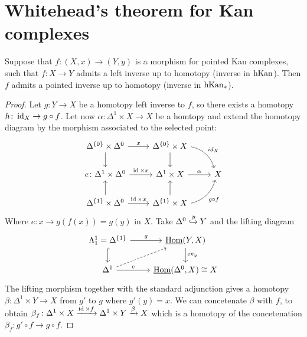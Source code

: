 \section{Whitehead's theorem for Kan complexes}

\begin{lem}
\label{homotopy inverses are pointed homotopy inverses}
    Suppose that $f\colon (X,x) \to (Y,y)$ is a morphism for pointed Kan complexes, such that $f\colon X \to Y$ admits a left inverse up to homotopy (inverse in $\operatorname{hKan}$).
    Then $f$ admits a pointed inverse up to homotopy (inverse in $\operatorname{hKan}_*$).
\end{lem}

\begin{proof}
    Let $g\colon Y \to X$ be a homotopy left inverse to $f$, so there exists a homotopy $h\colon \operatorname{id}_X \to g\circ f$.
    Let now $\alpha \colon \Delta^1 \times X \to X$ be a homtopy and extend the homotopy diagram by the morphism associated to the selected point:
    \[
    \begin{tikzcd}
        \Delta^{\{0\}} \times \Delta^0
        \ar[r, "x"]
        \ar[d]
        &
        \Delta^{\{0\}} \times X
        \ar[d]
        \ar[rd, bend left, "id_X"]
        \\
        e\colon\Delta^1 \times \Delta^0
        \ar[r, "\id \times x"]
        &
        \Delta^1 \times X
        \ar[r, "\alpha"]
        &
        X
        \\
        \Delta^{\{1\}} \times \Delta^0
        \ar[u]
        \ar[r, "\id \times x"]
        &
        \Delta^{\{1\}} \times X
        \ar[u]
        \ar[ru, bend right, "g \circ f"']
    \end{tikzcd}
    \]
    Where $e\colon x \to g(f(x))=g(y)$ in $X$.
    Take $\Delta^0 \xhookrightarrow{y} Y$ and the lifting diagram
    \[
    \begin{tikzcd}
        \Lambda^1_1= \Delta^{\{1\}}
        \ar[r, "g"]
        \ar[d, hook]
        &
        \underline{\Hom}(Y,X)
        \ar[d, "\ev_y"]
        \\
        \Delta^1
        \ar[ru, dashed]
        \ar[r, "e"]
        &
        \underline{\Hom}(\Delta^0,X) \cong X
    \end{tikzcd}
    \]
    The lifting morphism together with the standard adjunction gives a homotopy $\beta \colon \Delta^1 \times Y \to  X$ from $g'$ to $g$ where $g'(y)=x$.
    We can concetenate $\beta$ with $f$, to obtain $\beta_f \colon \Delta^1 \times X \xrightarrow{\operatorname{id} \times f} \Delta^1 \times Y \xrightarrow{ \beta}X$ which is a homotopy of the concetenation $\beta_f \colon g' \circ f \to g \circ f$.

\end{proof}
